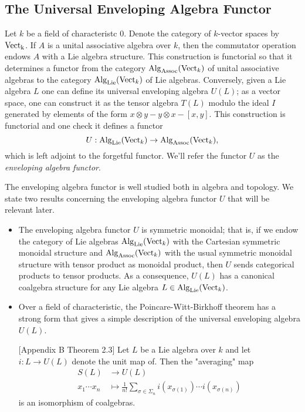 \subsection{The Universal Enveloping Algebra Functor}
Let $k$ be a field of characteristc $0$. Denote the category of $k$-vector spaces by $\operatorname{Vect_k}$.
If $A$ is a unital associative algebra over $k$, then the commutator operation endows $A$ with a Lie algebra structure. This construction is functorial so that it determines a functor from the category $\operatorname{Alg}_{\operatorname{Assoc}}(\operatorname{Vect}_k)$ of unital associative algebras to the category $\operatorname{Alg}_{\operatorname{Lie}}(\operatorname{Vect}_k)$ of Lie algebras. 
Conversely, given a Lie algebra $L$ one can define its universal enveloping algebra $U(L)$; as a vector space, one can construct it as the tensor algebra $T(L)$ modulo the ideal $I$ generated by 
 elements of the form $x\otimes y - y\otimes x-[x,y]$. 
This construction is functorial and one check it defines a functor
$$
U:\operatorname{Alg}_{\operatorname{Lie}}(\operatorname{Vect}_k) \rightarrow \operatorname{Alg}_{\operatorname{Assoc}}(\operatorname{Vect}_k),
$$
which is left adjoint to the forgetful functor.
We'll refer the functor $U$ as the \emph{enveloping algebra functor}. 

The enveloping algebra functor is well studied both in algebra and topology. We state two results concerning the enveloping algebra functor $U$ that will be relevant later.
\begin{itemize}
	\item The enveloping algebra functor $U$ is symmetric monoidal; that is, if we endow the category of Lie algebras $\operatorname{Alg}_{\operatorname{Lie}}(\operatorname{Vect}_k)$ with the Cartesian symmetric monoidal structure and $\operatorname{Alg}_{\operatorname{Assoc}}(\operatorname{Vect}_k)$ with the usual symmetric monoidal structure with tensor product as monoidal product, then $U$ sends categorical products to tensor products. As a consequence, $U(L)$ has a canonical coalgebra structure for any Lie algebra $L\in \operatorname{Alg}_{\operatorname{Lie}}(\operatorname{Vect}_k)$.
	\item Over a field of characteristic, the Poincare-Witt-Birkhoff theorem has a strong form that gives a simple description of the universal enveloping algebra $U(L)$. 
	\begin{theorem}
		\cite{Quillen_RHT}[Appendix B Theorem 2.3]
		Let $L$ be a Lie algebra over $k$ and let $i:L\to U(L)$ denote the unit map of. Then the "averaging" map
		\begin{align*}
			S(L) & \to U(L) \\
			x_1\cdots x_n & \mapsto \frac{1}{n!}\sum_{\sigma\in \Sigma_n} i(x_{\sigma(1)})\cdots i(x_{\sigma(n)})
		\end{align*}	
		is an isomorphism of coalgebras.
	\end{theorem}
	
\end{itemize}

